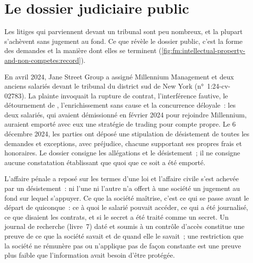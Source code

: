 \section{Le dossier judiciaire public}

Les litiges qui parviennent devant un tribunal sont peu nombreux, et la plupart s'achèvent sans jugement au fond. Ce que révèle le dossier public, c'est la forme des demandes
et la manière dont elles se terminent (\cref{fig:fm:intellectual-property-and-non-competes:record}).

En avril 2024, Jane Street Group a assigné Millennium Management et deux anciens salariés devant le tribunal du district sud de New York (n°~1:24-cv-02783). La
plainte invoquait la rupture de contrat, l'interférence fautive, le détournement de , l'enrichissement sans cause et la concurrence déloyale~: les deux
salariés, qui avaient démissionné en février 2024 pour rejoindre Millennium, auraient emporté avec eux une stratégie de trading pour compte propre. Le 6 décembre 2024, les parties
ont déposé une stipulation de désistement de toutes les demandes et exceptions, avec préjudice, chacune supportant ses propres frais et honoraires. Le dossier consigne les
allégations et le désistement~; il ne consigne aucune constatation établissant que quoi que ce soit a été emporté.

\begin{remark}\label{rem:fm:intellectual-property-and-non-competes:lessons}
L'affaire pénale a reposé sur les termes d'une loi et l'affaire civile s'est achevée par un désistement~: ni l'une ni l'autre n'a offert à une société un jugement au fond
sur lequel s'appuyer. Ce que la société maîtrise, c'est ce qui se passe avant le départ de quiconque~: ce à quoi le salarié pouvait accéder, ce qui a été journalisé, ce que disaient les contrats, et
si le secret a été traité comme un secret. Un journal de recherche (livre~7) daté et soumis à un contrôle d'accès constitue une preuve de ce que la société savait et
de quand elle le savait~; une restriction que la société ne rémunère pas ou n'applique pas de façon constante est une preuve plus faible que l'information avait besoin d'être protégée.
\end{remark}

